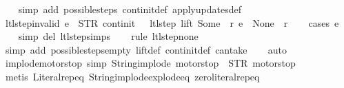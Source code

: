 \begin{isabellebody}
%
\isadelimproof
\ \ %
\endisadelimproof
%
\isatagproof
{}\isamarkupfalse%
\ {\isacharparenleft}simp\ add{\isacharcolon}\ possible{\isacharunderscore}steps{\isacharunderscore}{}\ continit{\isacharunderscore}def\ apply{\isacharunderscore}updates{\isacharunderscore}def{\isacharparenright}%
\endisatagproof
{\isafoldproof}%
%
\isadelimproof
\isanewline
%
\endisadelimproof
\isanewline
{}\isamarkupfalse%
\ ltl{\isacharunderscore}step{\isacharunderscore}{}{\isacharunderscore}invalid{\isacharcolon}\ {\isachardoublequoteopen}e\ {\isasymnoteq}\ {\isacharparenleft}STR\ {\isacharprime}{\isacharprime}continit{\isacharprime}{\isacharprime}{\isacharcomma}\ {\isacharbrackleft}{\isacharbrackright}{\isacharparenright}\ {\isasymLongrightarrow}\ ltl{\isacharunderscore}step\ lift\ {\isacharparenleft}Some\ {}{\isacharparenright}\ r\ e\ {\isacharequal}\ {\isacharparenleft}None{\isacharcomma}\ {\isacharbrackleft}{\isacharbrackright}{\isacharcomma}\ r{\isacharparenright}{\isachardoublequoteclose}\isanewline
%
\isadelimproof
\ \ %
\endisadelimproof
%
\isatagproof
{}\isamarkupfalse%
\ {\isacharparenleft}cases\ e{\isacharparenright}\isanewline
\ \ \isamarkupfalse%
\ {\isacharparenleft}simp\ del{\isacharcolon}\ ltl{\isacharunderscore}step{\isachardot}simps{\isacharparenright}\isanewline
\ \ \isamarkupfalse%
\ {\isacharparenleft}rule\ ltl{\isacharunderscore}step{\isacharunderscore}none{\isacharparenright}\isanewline
\ \ \isamarkupfalse%
\ {\isacharparenleft}simp\ add{\isacharcolon}\ possible{\isacharunderscore}steps{\isacharunderscore}empty\ lift{\isacharunderscore}def\ continit{\isacharunderscore}def\ can{\isacharunderscore}take{\isacharparenright}\isanewline
\ \ \isamarkupfalse%
\ auto%
\endisatagproof
{\isafoldproof}%
%
\isadelimproof
\isanewline
%
\endisadelimproof
\isanewline
{}\isamarkupfalse%
\ implode{\isacharunderscore}motorstop\ {\isacharbrackleft}simp{\isacharbrackright}{\isacharcolon}\ {\isachardoublequoteopen}String{\isachardot}implode\ {\isacharprime}{\isacharprime}motorstop{\isacharprime}{\isacharprime}\ {\isacharequal}\ STR\ {\isacharprime}{\isacharprime}motorstop{\isacharprime}{\isacharprime}{\isachardoublequoteclose}\isanewline
%
\isadelimproof
\ \ %
\endisadelimproof
%
\isatagproof
{}\isamarkupfalse%
\ {\isacharparenleft}metis\ Literal{\isachardot}rep{\isacharunderscore}eq\ String{\isachardot}implode{\isacharunderscore}explode{\isacharunderscore}eq\ zero{\isacharunderscore}literal{\isachardot}rep{\isacharunderscore}eq{\isacharparenright}%

\end{isabellebody}

